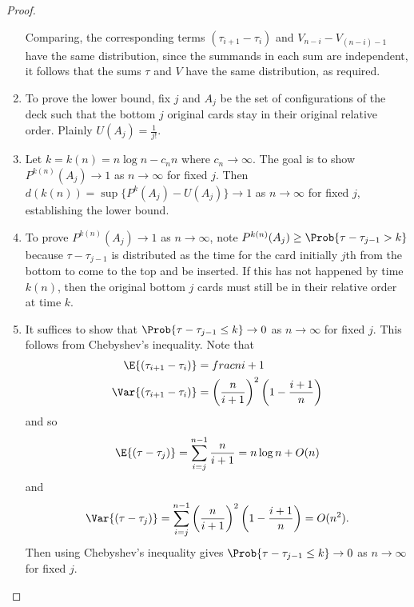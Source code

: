\documentclass[12pt]{article}
\begin{document}
\begin{proof}
\begin{enumerate}
            Comparing, the corresponding terms \( (\tau_{i+1} - \tau_i) \)
            and \( V_{n-i} - V_{(n-i)-1} \) have the same distribution, since
            the summands in each sum are independent, it follows that
            the sums \( \tau \) and \( V \) have the same distribution,
            as required.
        \item
            To prove the lower bound, fix \( j \) and \( A_j \) be the
            set of configurations of the deck such that the bottom \( j \)
            original cards stay in their original relative order.
            Plainly \( U(A_j) = \frac{1}{j!} \).
        \item
            Let \( k = k(n) = n \log n - c_n n \) where \( c_n \to
            \infty \). The goal is to show \( P^{k(n)}(A_j) \to 1 \) as \( n
            \to \infty \) for fixed \( j \).  Then \( d(k(n)) = \sup\{P^k(A_j)
            - U(A_j)\} \to 1 \) as \( n \to \infty \) for fixed \( j \),
            establishing the lower bound.
        \item
            To prove \( P^{k(n)}(A_j) \to 1 \) as \( n \to \infty \), note \(
            P^{k(n)}(A_j) \ge \Prob{\tau- \tau_{j-1} > k} \) because \( \tau
            - \tau_{j-1} \) is distributed as the time for the card
            initially \( j \)th from the bottom to come to the top and
            be inserted.  If this has not happened by time \( k(n) \), then
            the original bottom \( j \) cards must still be in their
            relative order at time \( k \).
        \item
            It suffices to show that \( \Prob{\tau- \tau_{j-1} \le k}
            \to 0 \) as \( n \to \infty \) for fixed \( j \).  This
            follows from Chebyshev's inequality.  Note that
            \begin{align*}
                \E{(\tau_{i+1} - \tau_i)} &= frac{n}{i+1} \\
                \Var{(\tau_{i+1} - \tau_i)} &= \left( \frac{n}{i+1}
                \right)^2 \left( 1 - \frac{i+1}{n} \right)
            \end{align*}
            and so
            \[
                \E{(\tau - \tau_j)} = \sum\limits_{i=j}^{n-1} \frac{n}{i+1}
                = n \log n + O(n)
            \] and
            \[
                \Var{(\tau - \tau_j)} = \sum\limits_{i=j}^{n-1} \left(
                \frac{n}{i+1} \right)^2 \left( 1 - \frac{i+1}{n} \right)=
                O(n^2).
            \] Then using Chebyshev's inequality gives \( \Prob{\tau-
            \tau_{j-1} \le k} \to 0 \) as \( n \to \infty \) for fixed \(
            j \).
    \end{enumerate}
\end{proof}
\end{document}

